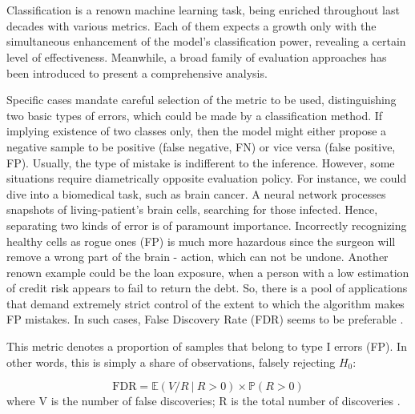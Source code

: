 \documentclass{article}
\begin{document}

 \

 \
 


Classification is a renown machine learning task, being enriched throughout last decades with various metrics. Each of them expects a growth only with the simultaneous enhancement of the model’s classification power, revealing a certain level of effectiveness. Meanwhile, a broad family of evaluation approaches has been introduced to present a comprehensive analysis. 

Specific cases mandate careful selection of the metric to be used, distinguishing two basic types of errors, which could be made by a classification method. If implying existence of two classes only, then the model might either propose a negative sample to be positive (false negative, FN) or vice versa (false positive, FP). Usually, the type of mistake is indifferent to the inference. However, some situations require diametrically opposite evaluation policy. For instance, we could dive into a biomedical task, such as brain cancer. A neural network processes snapshots of living-patient’s brain cells, searching for those infected. Hence, separating two kinds of error is of paramount importance. Incorrectly recognizing healthy cells as rogue ones (FP) is much more hazardous since the surgeon will remove a wrong part of the brain - action, which can not be undone. Another renown example could be the loan exposure, when a person with a low estimation of credit risk appears to fail to return the debt. So, there is a pool of applications that demand extremely strict control of the extent to which the algorithm makes FP mistakes. In such cases, False Discovery Rate (FDR) seems to be preferable \cite{peaks_de_novo}.

This metric denotes a proportion of samples that belong to type I errors (FP). In other words, this is simply a share of observations, falsely rejecting  $H_0$:

\begin{equation}
            \text{FDR} = \mathbb{E}(V / R \ | \ R > 0) \times \mathbb{P}(R>0)
        \end{equation}
        where V is the number of false discoveries; R is the total number of discoveries \cite{BH}.
\end{document}
